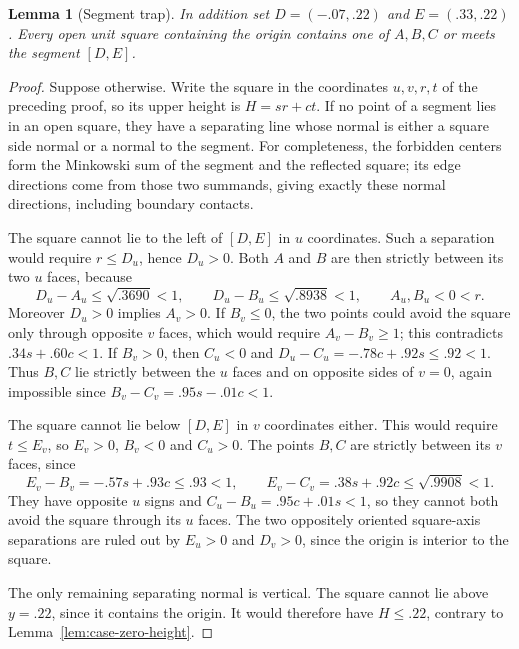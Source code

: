 \documentclass[11pt]{article}
\newtheorem{lemma}[theorem]{Lemma}
\begin{document}
\begin{lemma}[Segment trap]\label{lem:case-zero-trap}
In addition set $D=(-.07,.22)$ and $E=(.33,.22)$.
Every open unit square containing the origin contains one of $A,B,C$
or meets the segment $[D,E]$.
\end{lemma}
\begin{proof}
Suppose otherwise. Write the square in the coordinates $u,v,r,t$ of the
preceding proof, so its upper height is $H=sr+ct$.
If no point of a segment lies in an open square, they have a separating line whose normal is either a square side
normal or a normal to the segment.  For completeness, the forbidden
centers form the Minkowski sum of the segment and the reflected square;
its edge directions come from those two summands, giving exactly these
normal directions, including boundary contacts.

The square cannot lie to the left of $[D,E]$ in $u$ coordinates.
Such a separation would require $r\le D_u$, hence $D_u>0$.
Both $A$ and $B$ are then strictly between its two $u$ faces, because
\[
 D_u-A_u\le\sqrt{.3690}<1,\qquad
 D_u-B_u\le\sqrt{.8938}<1,
 \qquad A_u,B_u<0<r.
\]
Moreover $D_u>0$ implies $A_v>0$.
If $B_v\le0$, the two points could avoid the square only through opposite
$v$ faces, which would require $A_v-B_v\ge1$; this contradicts
$.34s+.60c<1$.  If $B_v>0$, then $C_u<0$ and
$D_u-C_u=-.78c+.92s\le.92<1$.
Thus $B,C$ lie strictly between the $u$ faces and on opposite sides of
$v=0$, again impossible since $B_v-C_v=.95s-.01c<1$.

The square cannot lie below $[D,E]$ in $v$ coordinates either.
This would require $t\le E_v$, so $E_v>0$, $B_v<0$ and $C_u>0$.
The points $B,C$ are strictly between its $v$ faces, since
\[
 E_v-B_v=-.57s+.93c\le.93<1,\qquad
 E_v-C_v=.38s+.92c\le\sqrt{.9908}<1.
\]
They have opposite $u$ signs and $C_u-B_u=.95c+.01s<1$,
so they cannot both avoid the square through its $u$ faces.
The two oppositely oriented square-axis separations are ruled out by
$E_u>0$ and $D_v>0$, since the origin is interior to the square.

The only remaining separating normal is vertical.  The square cannot
lie above $y=.22$, since it contains the origin.  It would therefore
have $H\le.22$, contrary to Lemma~\ref{lem:case-zero-height}.
\end{proof}
\end{document}
